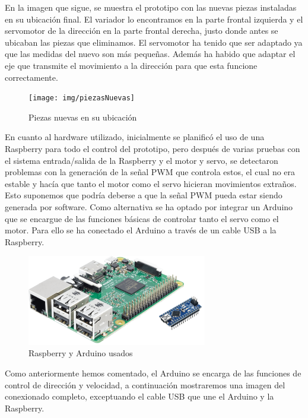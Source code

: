 \documentclass{pclass}
\begin{document}
\begin{itemize}
En la imagen que sigue, se muestra el prototipo con las nuevas piezas instaladas en su ubicación final. El variador lo encontramos en la parte frontal izquierda y el servomotor de la dirección en la parte frontal derecha, justo donde antes se ubicaban las piezas que eliminamos. El servomotor ha tenido que ser adaptado ya que las medidas del nuevo son más pequeñas. Además ha habido que adaptar el eje que transmite el movimiento a la dirección para que esta funcione correctamente.

\begin{figure}[H]
	\centering
	\texttt{[image: img/piezasNuevas]}
	\caption{Piezas nuevas en su ubicación}
	\label{fig:PiezasNuevas}
\end{figure}

En cuanto al hardware utilizado, inicialmente se planificó el uso de una Raspberry para todo el control del prototipo, pero después de varias pruebas con el sistema entrada/salida de la Raspberry y el motor y servo, se detectaron problemas con la generación de la señal PWM que controla estos, el cual no era estable y hacía que tanto el motor como el servo hicieran movimientos extraños. Esto suponemos que podría deberse a que la señal PWM pueda estar siendo generada por software. Como alternativa se ha optado por integrar un Arduino que se encargue de las funciones básicas de controlar tanto el servo como el motor. Para ello se ha conectado el Arduino a través de un cable USB a la Raspberry.

\begin{figure}[H]
	\centering
	\includegraphics[width=0.7\textwidth]{img/raspArd}
	\caption{Raspberry y Arduino usados}
	\label{fig:RaspArd}
\end{figure}

Como anteriormente hemos comentado, el Arduino se encarga de las funciones de control de dirección y velocidad, a continuación mostraremos una imagen del conexionado completo, exceptuando el cable USB que une el Arduino y la Raspberry.


\end{itemize}
\end{document}
